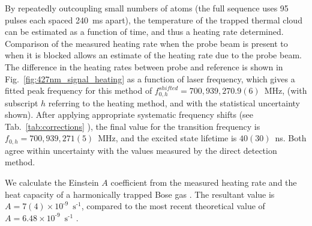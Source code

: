\documentclass[%
 reprint,
 amsmath,amssymb,
 aps,
 prl,
]{revtex4-2}
\begin{document}
By repeatedly outcoupling small numbers of atoms (the full sequence uses 95 pulses each spaced 240~ms apart), the temperature of the trapped thermal cloud can be estimated as a function of time, and thus a heating rate determined. Comparison of the measured heating rate when the probe beam is present to when it is blocked allows an estimate of the heating rate due to the probe beam.  The difference in the heating rates between probe and reference is shown in Fig.~\ref{fig:427nm_signal_heating} as a function of laser frequency, which gives a fitted peak frequency for this method of \(f_{0,h}^{shifted}=700,939,270.9(6)\)~MHz, (with subscript \(h\) referring to the heating method, and with the statistical uncertainty shown). After applying appropriate systematic frequency shifts (see Tab.~\ref{tab:corrections} \cite{SOMs}), the final value for the transition frequency is \(f_{0,h} = 700,939,271(5)\)~MHz, and the excited state lifetime is \(40(30)\)~ns. Both agree within uncertainty with the values measured by the direct detection method.

We calculate the Einstein \(A\) coefficient from the measured heating rate and the heat capacity of a harmonically trapped Bose gas \cite{SOMs}. The resultant value is \(A =7(4)\times 10^{\text{-}9}\)~\(\text{s}^{\text{-}1}\), compared to the most recent theoretical value of \(A=6.48\times 10^{\text{-}9}\)~\(\text{s}^{\text{-}1}\) \cite{PhysRevA.64.042510}.
\end{document}
